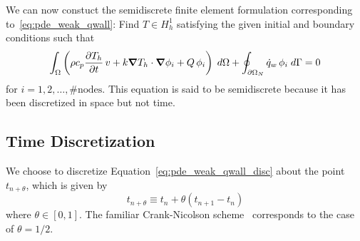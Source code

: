 We can now constuct the semidiscrete finite element formulation corresponding to~\eqref{eq:pde_weak_qwall}:  Find $T \in H^1_h$ satisfying the given initial and boundary conditions such that
\begin{equation}
  \int_\Omega \left(\rho c_p {\frac{\partial{T_h}}{\partial{t}}}\,v +k {\boldsymbol{\nabla}} {T_h}\cdot{\boldsymbol{\nabla}} {\phi_i} + Q\,\phi_i\right)\; d\Omega  + \oint_{\partial\Omega_N} \dot{q}_w\,\phi_i\; d\Gamma = 0
  \label{eq:pde_weak_qwall_disc}
\end{equation}
for $i=1,2,\ldots,\text{\# nodes}$.  This equation is said to be semidiscrete because it has been discretized in space but not time.

\subsection{Time Discretization}
We choose to discretize Equation~\eqref{eq:pde_weak_qwall_disc} about the point $t_{n+\theta}$, which is given by
\begin{equation}
  t_{n+\theta} \equiv t_{n} + \theta\left(t_{n+1} - t_{n}\right)
\end{equation}
where $\theta\in[0,1]$. The familiar Crank-Nicolson scheme~\cite{crank_nicolson} corresponds to the case of $\theta=1/2$.

